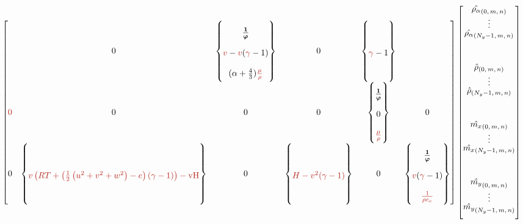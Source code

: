 \begin{sidewaysfigure}
{{\begin{minipage}[c]{\textwidth}
\begin{align*}
\begin{bmatrix}
{  }{
  }
& \entry{\my\mx  }
 0
& \entry{\my\my  }
  \subcoeff{
 \bm{\frac{1}{\vp}} %
  }{
 \ind{v}-\ind{v} (\ind{\gamma} -1)
  }{
 (\alpha +\frac{4}{3}) \ind{\frac{\mu}{\rho}}
  }
& \entry{\my\mz  }
 0
& \entry{\my{}e  }
  \subcoeff{
  }{
 \ind{\gamma} -1 
  }{
  }
\\\entry{\mz\rho_{\alpha} }
 \ind{0}
& 
\entry{\mz\rho}
 0
& \entry{\mz\mx }
 0
& \entry{\mz\my }
 0 
& \entry{\mz\mz }
  \subcoeff{
 \bm{\frac{1}{\vp}} %
  }{
 0 
  }{
 \ind{\frac{\mu}{\rho}}
  }
& \entry{\mz{}e }
 0
\\\entry{e\rho_{\alpha} }
 0 
& 
\entry{e\rho  }
  \subcoeff{
  }{
 \ind{v \left(R T+\left(\frac{1}{2} \left(u^2+v^2+w^2\right)-e\right) (\gamma -1)\right)-\text{vH}}
  }{
  }
& \entry{e\mx   }
 0
& \entry{e\my   }
  \subcoeff{
  }{
 \ind{H-v^2 (\gamma -1)}
  }{
  }
& \entry{e\mz   }
 0 
& \entry{ee     }
  \subcoeff{
 \bm{\frac{1}{\vp}} %
  }{
 \ind{v} (\ind{\gamma} -1)
  }{
 \ind{\frac{1}{\rho c_v}}
  }
\end{bmatrix}
\renewcommand{\arraystretch}{0.6}
\begin{bmatrix}
  \hat{\rho_{\alpha}}_{\left(0,\,m,\,n\right)} \\
  \vdots \\
  \hat{\rho_{\alpha}}_{\left(N_y-1,\,m,\,n\right)} \\
\\%
\\%
\\%
\\%
  \hat{\rho}_{\left(0,\,m,\,n\right)} \\
  \vdots \\
  \hat{\rho}_{\left(N_y-1,\,m,\,n\right)} \\
\\%
\\%
\\%
\\%
  \hat{\mx}_{\left(0,\,m,\,n\right)} \\
  \vdots \\
  \hat{\mx}_{\left(N_y-1,\,m,\,n\right)} \\
\\%
\\%
\\%
\\%
  \hat{\my}_{\left(0,\,m,\,n\right)} \\
  \vdots \\
  \hat{\my}_{\left(N_y-1,\,m,\,n\right)} \\
\\%

\end{bmatrix}
\end{align*}
\end{minipage}}}
\end{sidewaysfigure}
